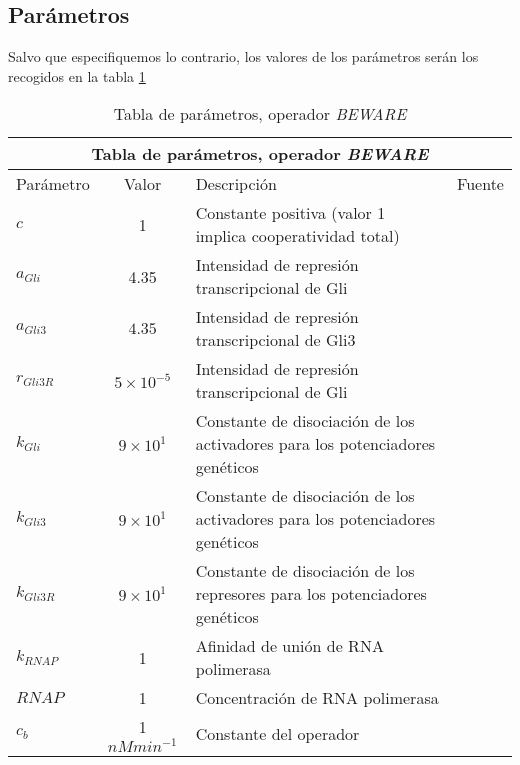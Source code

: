 \subsection{Parámetros}
Salvo que especifiquemos lo contrario, los valores de los parámetros serán los recogidos en la tabla \ref{beware_params}
\begin{table}[h]
	\begin{center}
		
		\begin{tabular}{ |p{3cm}||c|p{3cm}|p{3cm}|  }
			\hline
			\multicolumn{4}{|c|}{Tabla de parámetros, operador \textit{BEWARE}} \\
			\hline
			Parámetro & Valor & Descripción & Fuente\\
			\hline
			$c $  & 1    &\tiny{Constante positiva (valor 1 implica cooperatividad total)} &   \cite{cambon1}\\
			$a_{Gli}$ &   4.35  & \tiny{Intensidad de represión transcripcional de Gli}   & \cite{cambon1}\\
			$a_{Gli3} $ & $4.35$ & \tiny{ Intensidad de represión transcripcional de Gli3 } &  \cite{cambon1}\\
			$r_{Gli3R}$   &$5\times10^{-5}$ & \tiny{ Intensidad de represión transcripcional de Gli } &  \cite{cambon1}\\
			$k_{Gli}$ &  $9\times10^{1}$  & \tiny{ Constante de disociación de los activadores para los potenciadores genéticos } & \cite{cambon1}\\
			$k_{Gli3}$ & $9\times10^{1}$  & \tiny{ Constante de disociación de los activadores para los potenciadores genéticos }   & \cite{cambon1}\\
			$k_{Gli3R}$ & $9\times10^{1}$ & \tiny{ Constante de disociación de los represores para los potenciadores genéticos }   & \cite{cambon1}\\
			
			$k_{RNAP}$& 1  &  \tiny{Afinidad de unión   de RNA polimerasa} & \cite{cambon1}\\
			$RNAP$& 1  & \tiny{Concentración de RNA polimerasa} & \cite{cambon1}\\
			$c_b$& 1 $ nMmin^{-1}$  & \tiny{ Constante del operador} & \cite{cambon1}\\
			\hline
		\end{tabular}
		
	\end{center}
	\caption{Tabla de parámetros, operador \textit{BEWARE}}\label{beware_params}
\end{table}

